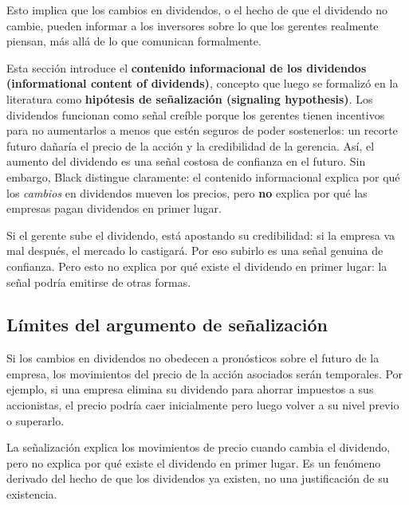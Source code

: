 \documentclass[12pt]{article}
\begin{document}
Esto implica que los cambios en dividendos, o el hecho de que el dividendo no cambie, pueden informar a los inversores sobre lo que los gerentes realmente piensan, m\'as all\'a de lo que comunican formalmente.

\begin{explicacion}
Esta secci\'on introduce el \textbf{contenido informacional de los dividendos (informational content of dividends)}, concepto que luego se formaliz\'o en la literatura como \textbf{hip\'otesis de se\~nalizaci\'on (signaling hypothesis)}. Los dividendos funcionan como se\~nal cre\'ible porque los gerentes tienen incentivos para no aumentarlos a menos que est\'en seguros de poder sostenerlos: un recorte futuro da\~nar\'ia el precio de la acci\'on y la credibilidad de la gerencia. As\'i, el aumento del dividendo es una se\~nal costosa de confianza en el futuro. Sin embargo, Black distingue claramente: el contenido informacional explica por qu\'e los \textit{cambios} en dividendos mueven los precios, pero \textbf{no} explica por qu\'e las empresas pagan dividendos en primer lugar.
\end{explicacion}

\begin{intuicion}
Si el gerente sube el dividendo, est\'a apostando su credibilidad: si la empresa va mal despu\'es, el mercado lo castigar\'a. Por eso subirlo es una se\~nal genuina de confianza. Pero esto no explica por qu\'e existe el dividendo en primer lugar: la se\~nal podr\'ia emitirse de otras formas.
\end{intuicion}

\subsection{L\'imites del argumento de se\~nalizaci\'on}

Si los cambios en dividendos no obedecen a pron\'osticos sobre el futuro de la empresa, los movimientos del precio de la acci\'on asociados ser\'an temporales. Por ejemplo, si una empresa elimina su dividendo para ahorrar impuestos a sus accionistas, el precio podr\'ia caer inicialmente pero luego volver a su nivel previo o superarlo.

\begin{intuicion}
La se\~nalizaci\'on explica los movimientos de precio cuando cambia el dividendo, pero no explica por qu\'e existe el dividendo en primer lugar. Es un fen\'omeno derivado del hecho de que los dividendos ya existen, no una justificaci\'on de su existencia.
\end{intuicion}
\end{document}
